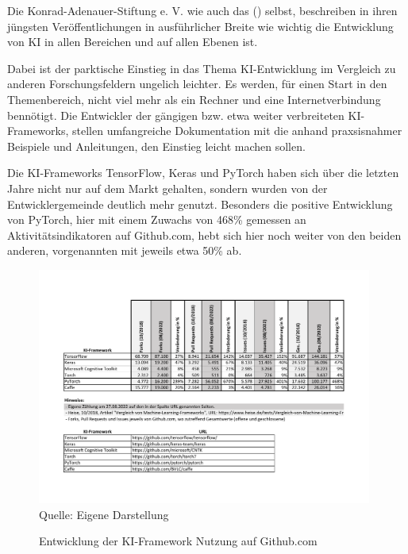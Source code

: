 \documentclass[12pt,oneside,titlepage,listof=totoc,bibliography=totoc]{scrartcl}
\begin{document}
Die Konrad-Adenauer-Stiftung e. V. \parencite{52-wangermann2020ki} wie auch das \citeauthor[]{53-ki-strat} (\citeyear[]{53-ki-strat}) selbst, beschreiben in ihren jüngsten Veröffentlichungen in ausführlicher Breite wie wichtig die Entwicklung von KI in allen Bereichen und auf allen Ebenen ist.

Dabei ist der parktische Einstieg in das Thema KI-Entwicklung im Vergleich zu anderen Forschungsfeldern ungelich leichter. Es werden, für einen Start in den Themenbereich, nicht viel mehr als ein Rechner und eine Internetverbindung bennötigt. Die Entwickler der gängigen bzw. etwa weiter verbreiteten KI-Frameworks, stellen umfangreiche Dokumentation mit die anhand praxsisnahmer Beispiele und Anleitungen, den Einstieg leicht machen sollen. 

Die KI-Frameworks TensorFlow, Keras und PyTorch haben sich über die letzten Jahre nicht nur auf dem Markt gehalten, sondern wurden von der Entwicklergemeinde deutlich mehr genutzt. Besonders die positive Entwicklung von PyTorch, hier mit einem Zuwachs von 468\% gemessen an Aktivitätsindikatoren auf Github.com, hebt sich hier noch weiter von den beiden anderen, vorgenannten mit jeweils etwa 50\% ab. 

\begin{figure}[H]
	\caption{Entwicklung der KI-Framework Nutzung auf Github.com}\label{fig:ki-framework-nutzung}
	\includegraphics[width=0.98\textwidth]{ki-framework-nutzung.pdf}
	\\
	Quelle: Eigene Darstellung
\end{figure}


\end{document}
